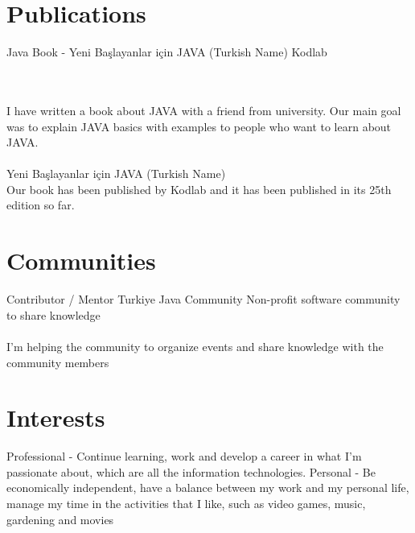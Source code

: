 \documentclass[]{cv-style}
\begin{document}
	\section{Publications}
	\begin{entrylist}
		\entry
		{}
		{Java Book - Yeni Başlayanlar için JAVA (Turkish Name)}
		{Kodlab}
		{
			\\
			\\
			I have written a book about JAVA with a friend from university. Our main goal was to explain JAVA basics with examples to people who want to learn about JAVA.
			\\
			\\
			Yeni Başlayanlar için JAVA (Turkish Name)
			\\
			Our book has been published by Kodlab and it has been published in its 25th edition so far.

		}
		{\vspace{-0.3cm}}
	\end{entrylist}

	\section{Communities}
	\begin{entrylist}
		\entry
		{}
		{Contributor / Mentor}
		{Turkiye Java Community}
		{
			Non-profit software community to share knowledge
			\\
			\\
			I'm helping the community to organize events and share knowledge with the community members
		}
		{\vspace{-0.3cm}}
	\end{entrylist}

	\section{Interests}

	\begin{entrylist}
		\entry
		{Professional}
		{- {\normalfont Continue learning, work and develop a career in what I'm passionate about, which are all the information technologies. }}
		{}
		{\vspace{-0.3cm}}
		\entry
		{Personal}
		{- {\normalfont Be economically independent, have a balance between my work and my personal life, manage my time in the activities that I like, such as video games, music, gardening and movies }}
		{}
		{}
	\end{entrylist}
\end{document}

